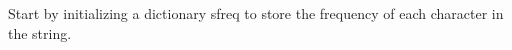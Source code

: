 \documentclass[preview]{standalone}
\begin{document}
Start by initializing a dictionary sfreq to store the frequency of each character in the string.\\
\end{document}
